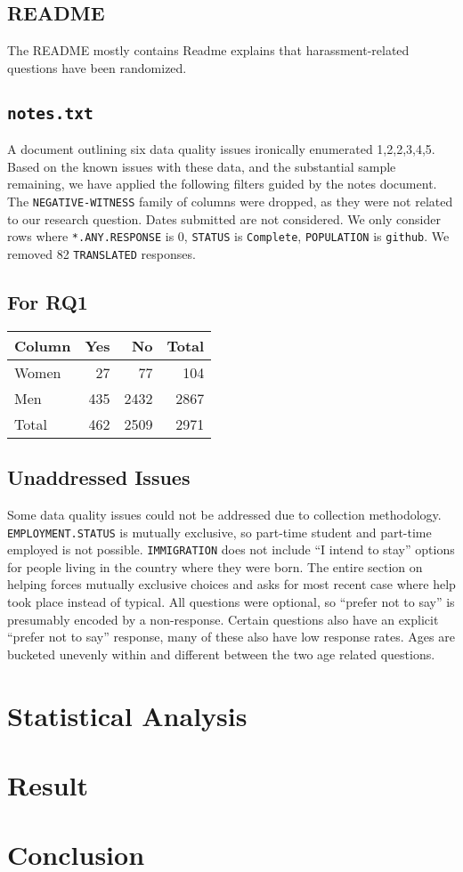 \documentclass[journal,12pt,onecolumn,]{IEEEtran}
\begin{document}
\subsection{\textsc{README}}

The \textsc{README} mostly contains Readme explains that harassment-related questions have been randomized.

\subsection{\texttt{notes.txt}}

A document outlining six data quality issues ironically enumerated 1,2,2,3,4,5.
Based on the known issues with these data, and the substantial sample remaining, we have applied the following filters guided by the notes document.
The \texttt{NEGATIVE-WITNESS} family of columns were dropped, as they were not related to our research question.
Dates submitted are not considered.
We only consider rows where \texttt{*.ANY.RESPONSE} is 0, \texttt{STATUS} is \texttt{Complete}, \texttt{POPULATION} is \texttt{github}.
We removed 82 \texttt{TRANSLATED} responses.

\subsection{For RQ1}

\begin{tabular}{lrrr}
    \toprule
    Column & Yes & No   & Total \\
    \midrule
    Women  & 27  & 77   & 104   \\
    Men    & 435 & 2432 & 2867  \\
    Total  & 462 & 2509 & 2971  \\
    \bottomrule
\end{tabular}

\subsection{Unaddressed Issues}

Some data quality issues could not be addressed due to collection methodology.
\texttt{EMPLOYMENT.STATUS} is mutually exclusive, so part-time student and part-time employed is not possible.
\texttt{IMMIGRATION} does not include ``I intend to stay'' options for people living in the country where they were born.
The entire section on helping forces mutually exclusive choices and asks for most recent case where help took place instead of typical.
All questions were optional, so ``prefer not to say'' is presumably encoded by a non-response. Certain questions also have an explicit ``prefer not to say'' response, many of these also have low response rates.
Ages are bucketed unevenly within and different between the two age related questions.

\section{Statistical Analysis}

\section{Result}


\section{Conclusion}



\end{document}

